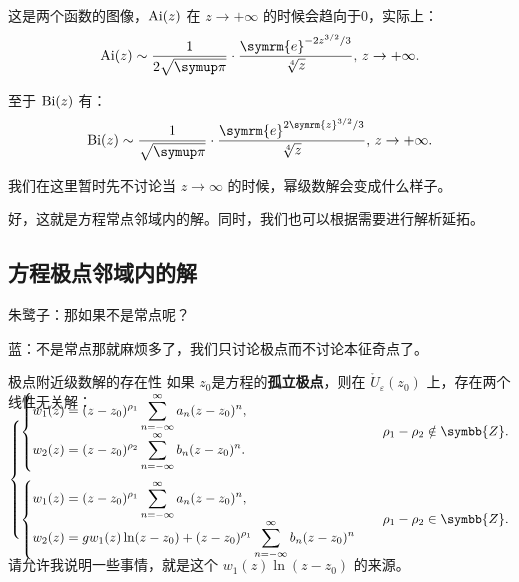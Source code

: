 这是两个函数的图像，\(\mathop{\rm Ai}(z)\) 在 \(z\to +\infty \) 的时候会趋向于0，实际上：
\[
	\Ai(z)\sim \frac{1}{2 \sqrt{\symup\pi }}\cdot \frac{\symrm{e} ^{-{2 z^{3/2}}/{3}}}{ \sqrt[4]{z}},\, z\to +\infty
	.\]

至于 \(\mathop{\rm Bi}(z)\) 有：
\[
	\Bi(z)\sim\frac{1}{\sqrt{\symup \pi }}\cdot  \dfrac{\symrm{e} ^{2\symrm{z} ^{3/2}/3}}{\sqrt[4]{z}},\, z\to +\infty
	.\]

我们在这里暂时先不讨论当 \(z\to \infty\) 的时候，幂级数解会变成什么样子。

好，这就是方程常点邻域内的解。同时，我们也可以根据需要进行解析延拓。
\subsection{方程极点邻域内的解}
朱鹭子：那如果不是常点呢？

蓝：不是常点那就麻烦多了，我们只讨论极点而不讨论本征奇点了。

\begin{tho}[]{极点附近级数解的存在性}{}
	如果 \(z_0\)是方程的\textbf{孤立极点}，则在 \(\mathring{U}_\varepsilon (z_0)\) 上，存在两个线性无关解：\vspace{2em}
	\[
		\begin{cases}
			\\[-3.5em]
			\begin{cases}
				\displaystyle w_1(z)=(z-z_0)^{\rho _1}\sum_{n=-\infty}^{\infty} a_n (z-z_0)^n, \\[4pt]
				\displaystyle w_2(z)=(z-z_0)^{\rho _2}\sum_{n=-\infty}^{\infty} b_n (z-z_0)^n.
			\end{cases}           & \rho _1-\rho _2\notin\symbb{Z}.           \\[30pt]
			\begin{cases}
				\displaystyle w_1(z)=(z-z_0)^{\rho _1}\sum_{n=-\infty}^{\infty} a_n (z-z_0)^n, \\
				\displaystyle w_2(z)=gw_1(z)\ln (z-z_0)+(z-z_0)^{\rho _1}\sum_{n=-\infty}^{\infty} b_n (z-z_0)^n
			\end{cases} & \rho _1-\rho _2\in\symbb{Z}.
			\\[-1.5em]
		\end{cases}
	\]
	\vspace{0em}
\end{tho}

请允许我说明一些事情，就是这个 \(w_1(z)\ln (z-z_0) \) 的来源。

